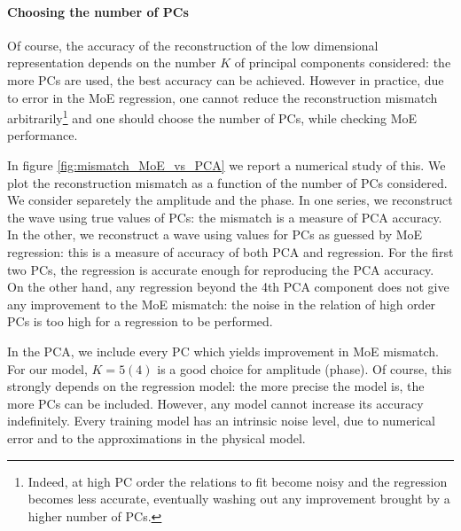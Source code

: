 \paragraph{Choosing the number of PCs}
Of course, the accuracy of the reconstruction of the low dimensional representation depends on the number $K$ of principal components considered: the more PCs are used, the best accuracy can be achieved.
However in practice, due to error in the MoE regression, one cannot reduce the reconstruction mismatch
arbitrarily\footnote{Indeed, at high PC order the relations to fit become noisy and the regression becomes less accurate, eventually washing out any improvement brought by a higher number of PCs.}
and one should choose the number of PCs, while checking MoE performance.
\par
In figure \ref{fig:mismatch_MoE_vs_PCA} we report a numerical study of this. We plot the reconstruction mismatch as a function of the number of PCs considered. We consider separetely the amplitude and the phase. In one series, we reconstruct the wave using true values of PCs: the mismatch is a measure of PCA accuracy. In the other, we reconstruct a wave using values for PCs as guessed by MoE regression: this is a measure of accuracy of both PCA and regression.
For the first two PCs, the regression is accurate enough for reproducing the PCA accuracy.
On the other hand, any regression beyond the 4th PCA component does not give any improvement to the MoE mismatch: the noise in the relation of high order PCs is too high for a regression to be performed.
\par
In the PCA, we include every PC which yields improvement in MoE mismatch. For our model, $K = 5(4)$ is a good choice for amplitude (phase).
Of course, this strongly depends on the regression model: the more precise the model is, the more PCs can be included.
However, any model cannot increase its accuracy indefinitely. Every training model has an intrinsic noise level, due to numerical error and to the approximations in the physical model.
